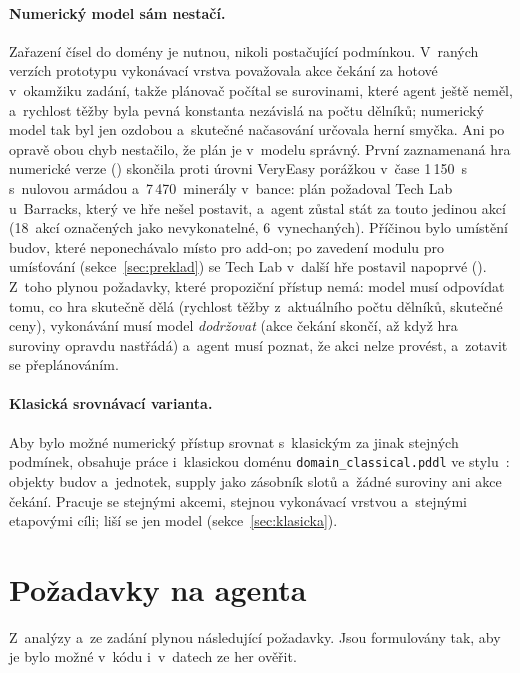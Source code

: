 \paragraph{Numerický model sám nestačí.} Zařazení čísel do domény je nutnou, nikoli postačující podmínkou. V~raných verzích prototypu vykonávací vrstva považovala akce čekání za hotové v~okamžiku zadání, takže plánovač počítal se surovinami, které agent ještě neměl, a~rychlost těžby byla pevná konstanta nezávislá na počtu dělníků; numerický model tak byl jen ozdobou a~skutečné načasování určovala herní smyčka. Ani po opravě obou chyb nestačilo, že plán je v~modelu správný. První zaznamenaná hra numerické verze () skončila proti úrovni VeryEasy porážkou v~čase 1\,150~s s~nulovou armádou a~7\,470~minerály v~bance: plán požadoval Tech Lab u~Barracks, který ve hře nešel postavit, a~agent zůstal stát za touto jedinou akcí (18~akcí označených jako nevykonatelné, 6~vynechaných). Příčinou bylo umístění budov, které neponechávalo místo pro add-on; po zavedení modulu pro umísťování (sekce~\ref{sec:preklad}) se Tech Lab v~další hře postavil napoprvé (). Z~toho plynou požadavky, které propoziční přístup nemá: model musí odpovídat tomu, co hra skutečně dělá (rychlost těžby z~aktuálního počtu dělníků, skutečné ceny), vykonávání musí model \emph{dodržovat} (akce čekání skončí, až když hra suroviny opravdu nastřádá) a~agent musí poznat, že akci nelze provést, a~zotavit se přeplánováním.

\paragraph{Klasická srovnávací varianta.} Aby bylo možné numerický přístup srovnat s~klasickým za jinak stejných podmínek, obsahuje práce i~klasickou doménu \texttt{domain\_classical.pddl} ve stylu~\cite{Orava2025}: objekty budov a~jednotek, supply jako zásobník slotů a~žádné suroviny ani akce čekání. Pracuje se stejnými akcemi, stejnou vykonávací vrstvou a~stejnými etapovými cíli; liší se jen model (sekce~\ref{sec:klasicka}).

\section{Požadavky na agenta}
\label{sec:pozadavky}

Z~analýzy a~ze zadání plynou následující požadavky. Jsou formulovány tak, aby je bylo možné v~kódu i~v~datech ze her ověřit.

